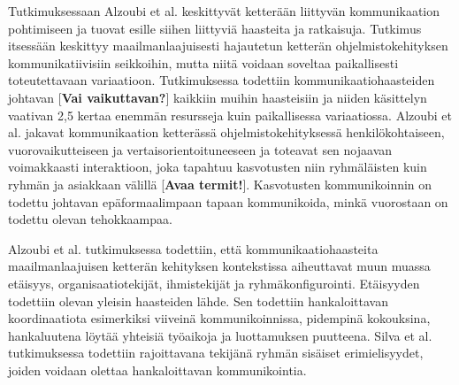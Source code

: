 Tutkimuksessaan Alzoubi et al. \cite{ALZOUBI201622} keskittyvät ketterään liittyvän kommunikaation pohtimiseen ja tuovat esille siihen liittyviä haasteita ja ratkaisuja. Tutkimus itsessään keskittyy maailmanlaajuisesti hajautetun ketterän ohjelmistokehityksen kommunikatiivisiin seikkoihin, mutta niitä voidaan soveltaa paikallisesti toteutettavaan variaatioon. Tutkimuksessa todettiin kommunikaatiohaasteiden johtavan [\textbf{Vai vaikuttavan?}] kaikkiin muihin haasteisiin ja niiden käsittelyn vaativan 2,5 kertaa enemmän resursseja kuin paikallisessa variaatiossa. Alzoubi et al. jakavat kommunikaation ketterässä ohjelmistokehityksessä henkilökohtaiseen, vuorovaikutteiseen ja vertaisorientoituneeseen ja toteavat sen nojaavan voimakkaasti interaktioon, joka tapahtuu kasvotusten niin ryhmäläisten kuin ryhmän ja asiakkaan välillä [\textbf{Avaa termit!}]. Kasvotusten kommunikoinnin on todettu johtavan epäformaalimpaan tapaan kommunikoida, minkä vuorostaan on todettu olevan tehokkaampaa.

Alzoubi et al. tutkimuksessa \cite{ALZOUBI201622} todettiin, että kommunikaatiohaasteita maailmanlaajuisen ketterän kehityksen kontekstissa aiheuttavat muun muassa etäisyys, organisaatiotekijät, ihmistekijät ja ryhmäkonfigurointi. Etäisyyden todettiin olevan yleisin haasteiden lähde. Sen todettiin hankaloittavan koordinaatiota esimerkiksi viiveinä kommunikoinnissa, pidempinä kokouksina, hankaluutena löytää yhteisiä työaikoja ja luottamuksen puutteena. Silva et al. tutkimuksessa \cite{SELLERISILVA201520} todettiin rajoittavana tekijänä ryhmän sisäiset erimielisyydet, joiden voidaan olettaa hankaloittavan kommunikointia.
